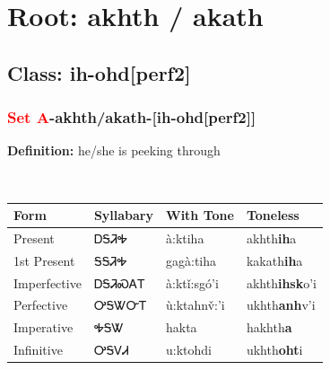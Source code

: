 \needspace{4in}
\section*{Root: akhth / akath}
\nopagebreak
{}
\needspace{3in}
\subsection*{Class: ih-ohd[perf2]}
\nopagebreak
\needspace{2in}
\subsubsection*{\textcolor{Red}{Set A}{-}\textbf{akhth/akath}{-}[ih-ohd[perf2]]}
\nopagebreak
\textbf{Definition: } he/she is peeking through
\\[0.5em]
\begin{tabularx}{\textwidth}{l X X X}%
\toprule%
\textbf{Form}&\textbf{Syllabary}&\textbf{With Tone}&\textbf{Toneless}\\%
\midrule%
Present&ᎠᎦᏘᎭ&à:ktiha&akhth\textbf{ih}a\\%
1st Present&ᎦᎦᏘᎭ&gagà:tiha&kakath\textbf{ih}a\\%
Imperfective&ᎠᎦᏘᏍᎪᎢ&à:ktǐ:sgó’i&akhth\textbf{ihsk}o'i\\%
Perfective&ᎤᎦᏔᏅᎢ&ù:ktahnv̌:’i&ukhth\textbf{anh}v'i\\%
Imperative&ᎭᎦᏔ&hakta&hakhth\textbf{a}\\%
Infinitive&ᎤᎦᏙᏗ&u:ktohdi&ukhth\textbf{oht}i\\%
\bottomrule%
\end{tabularx}
\\[1em]
